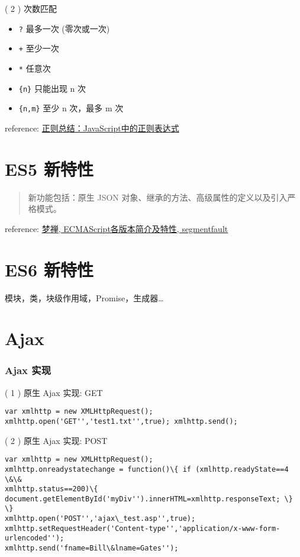 ( 2 ) 次数匹配

\begin{itemize}
\tightlist
\item
  \texttt{?} 最多一次 (零次或一次)
\item
  \texttt{+} 至少一次
\item
  \texttt{*} 任意次
\item
  \texttt{\{n\}} 只能出现 n 次
\item
  \texttt{\{n,m\}} 至少 n 次，最多 m 次
\end{itemize}

reference:
\href{http://www.nowamagic.net/librarys/veda/detail/1283}{正则总结：JavaScript中的正则表达式}

\section{ES5 新特性}\label{es5-ux65b0ux7279ux6027}

\begin{quote}
新功能包括：原生 JSON 对象、继承的方法、高级属性的定义以及引入严格模式。
\end{quote}

reference: \href{http://segmentfault.com/a/1190000003493604}{梦禅,
ECMAScript各版本简介及特性, segmentfault}

\section{ES6 新特性}\label{es6-ux65b0ux7279ux6027}

模块，类，块级作用域，Promise，生成器\ldots{}

\section{Ajax}\label{ajax}

\subsubsection{Ajax 实现}\label{ajax-ux5b9eux73b0}

( 1 ) 原生 Ajax 实现: GET

\begin{verbatim}
var xmlhttp = new XMLHttpRequest();
xmlhttp.open('GET'','test1.txt'',true); xmlhttp.send(); 
\end{verbatim}

( 2 ) 原生 Ajax 实现: POST

\begin{verbatim}var xmlhttp = new XMLHttpRequest();
xmlhttp.onreadystatechange = function()\{ if (xmlhttp.readyState==4 \&\&
xmlhttp.status==200)\{
document.getElementById('myDiv'').innerHTML=xmlhttp.responseText; \} \}
xmlhttp.open('POST'','ajax\_test.asp'',true);
xmlhttp.setRequestHeader('Content-type'','application/x-www-form-urlencoded'');
xmlhttp.send('fname=Bill\&lname=Gates''); 
\end{verbatim}

